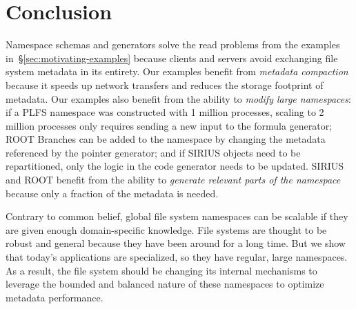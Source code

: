 \vspace{-0.75em}
\section{Conclusion}
\vspace{-0.75em}

Namespace schemas and generators solve the read problems from the examples
in~\S\ref{sec:motivating-examples} because clients and servers avoid exchanging
file system metadata in its entirety. Our examples benefit from \emph{metadata
compaction} because it speeds up network transfers and reduces the storage
footprint of metadata.  Our examples also benefit from the ability to
\emph{modify large namespaces}: if a PLFS namespace was constructed with 1
million processes, scaling to 2 million processes only requires sending a new
input to the formula generator; ROOT Branches can be added to the namespace by
changing the metadata referenced by the pointer generator; and if SIRIUS
objects need to be repartitioned, only the logic in the code generator needs to
be updated.  SIRIUS and ROOT benefit from the ability to \emph{generate
relevant parts of the namespace} because only a fraction of the metadata is
needed.

Contrary to common belief, global file system namespaces can be scalable if
they are given enough domain-specific knowledge.  File systems are thought to
be robust and general because they have been around for a long time. But we
show that today's applications are specialized, so they have regular, large
namespaces. As a result, the file system should be changing its internal
mechanisms to leverage the bounded and balanced nature of these namespaces to
optimize metadata performance.

